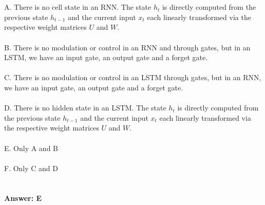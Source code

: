 \documentclass[prl,twocolumn,showpacs,preprintnumbers,superscriptaddress]{revtex4}
\theoremstyle{plain}
\theoremstyle{definition}
\begin{document}
\begin{widetext}
\\
\\
A. There is no cell state in an RNN. The state $h_{t}$ is directly
computed from the previous state $h_{t-1}$ and the current input
$x_{t}$ each linearly transformed via the respective weight matrices
$U$ and $W$.
\\
\\
B. There is no modulation or control in an RNN and through gates, but in an LSTM, we have an input gate, an output gate and a forget gate.
\\
\\
C. There is no modulation or control in an LSTM through gates, but in an RNN, we have an input gate, an output gate and a forget gate.
\\
\\
D. There is no hidden state in an LSTM. The state $h_{t}$ is directly
computed from the previous state $h_{t-1}$ and the current input
$x_{t}$ each linearly transformed via the respective weight matrices
$U$ and $W$.
\\
\\
E. Only A and B
\\
\\
F. Only C and D
\\
\\
\\
\textbf{Answer: E}
\\
\\
\\
\\
\\
\end{widetext}
\end{document}
